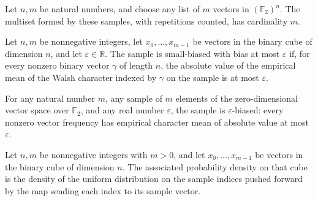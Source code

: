 \begin{theorem}
\label{FABL.randomSmallBiasMultiset_card}
\leanok
{}
Let $n,m$ be natural numbers, and choose any list of $m$ vectors in $(\mathbb{F}_2)^n$.
The multiset formed by these samples, with repetitions counted, has cardinality $m$.
\end{theorem}

\begin{definition}
\label{FABL.IsSmallBiasedSample}
\leanok
{}
Let $n,m$ be nonnegative integers, let $x_0,\ldots,x_{m-1}$ be vectors in the binary
cube of dimension $n$, and let $\varepsilon\in\mathbb{R}$. The sample is small-biased
with bias at most $\varepsilon$ if, for every nonzero binary vector $\gamma$ of length
$n$, the absolute value of the empirical mean of the Walsh character indexed by $\gamma$
on the sample is at most $\varepsilon$.
\end{definition}

\begin{theorem}
\label{FABL.isSmallBiasedSample_zero}
\leanok
{}
For any natural number $m$, any sample of $m$ elements of the zero-dimensional vector
space over $\mathbb F_2$, and any real number $\varepsilon$, the sample is
$\varepsilon$-biased: every nonzero vector frequency has empirical character mean of
absolute value at most $\varepsilon$.
\end{theorem}

\begin{definition}
\label{FABL.randomSmallBiasDensity}
\leanok
{}
Let $n,m$ be nonnegative integers with $m>0$, and let $x_0,\ldots,x_{m-1}$ be vectors in
the binary cube of dimension $n$. The associated probability density on that cube is the
density of the uniform distribution on the sample indices pushed forward by the map
sending each index to its sample vector.
\end{definition}

